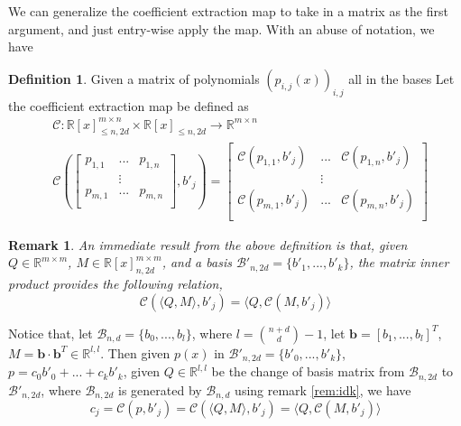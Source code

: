 \documentclass[12pt]{amsart}
\numberwithin{equation}{section}
\newtheorem{remark}[thm]{Remark}
\theoremstyle{definition}
\newtheorem{definition}[thm]{Definition}
\numberwithin{thm}{section}
\begin{document}
\smallskip 
We can generalize the {coefficient extraction map} to take in a matrix as the first argument, and just entry-wise apply the map. With an abuse of notation, we have 
\begin{definition}
     Given a matrix of polynomials $(p_{i, j}(x))_{i, j}$ all in the bases Let the {coefficient extraction map} be defined as 
     \begin{equation*}
          \begin{split}
               & \mathcal{C}: \mathbb{R}[x]_{\leq n, 2d}^{m \times n} \times \mathbb{R}[x]_{\leq n, 2d} \rightarrow \mathbb{R}^{m \times n} \\
               & \mathcal{C}(
                    \begin{bmatrix} 
                         p_{1, 1} & ... & p_{1, n} \\
                         & \vdots \\
                         p_{m, 1} & ... & p_{m, n} \\
                    \end{bmatrix}, b'_j
               ) = \begin{bmatrix} 
                    \mathcal{C}(p_{1, 1}, b'_j) & ... &  \mathcal{C}(p_{1, n}, b'_j) \\
                    & \vdots \\
                    \mathcal{C}(p_{m, 1}, b'_j) & ... &  \mathcal{C}(p_{m, n}, b'_j) \\
                    \end{bmatrix}
          \end{split}
     \end{equation*}
\end{definition}

\begin{remark}
     An immediate result from the above definition is that, given $Q \in \mathbb{R}^{m \times m}$, $M \in \mathbb{R}[x]_{n, 2d}^{m \times m}$, 
     and a basis $\mathcal{B}'_{n, 2d} = \{b'_1, ..., b'_k\}$, the matrix inner product provides the following relation,
     \begin{equation*}
          \mathcal{C}(\langle Q, M \rangle, b'_j) = \langle Q, \mathcal{C}(M, b'_j) \rangle
     \end{equation*}
\end{remark}

\smallskip
Notice that, let $\mathcal{B}_{n, d} = \{b_0,...,b_l\}$, where $l = {n + d \choose d} - 1$, 
let $\mathbf{b} = [b_1, ..., b_l]^T$, $M = \mathbf{b} \cdot \mathbf{b}^T \in \mathbb{R}^{l, l}$. 
Then given $p(x)$ in $\mathcal{B}'_{n, 2d} = \{b'_0, ..., b'_k\}$, $p = c_0b'_0 + ... + c_k b'_k$, 
given $Q \in \mathbb{R}^{l, l}$ be the change of basis matrix from $\mathcal{B}_{n, 2d}$ to $\mathcal{B}'_{n, 2d}$, 
where $\mathcal{B}_{n, 2d}$ is generated by $\mathcal{B}_{n, d}$ using remark \ref{rem:idk}, we have
\begin{equation}
     c_j = \mathcal{C}(p, b'_j) = \mathcal{C}(\langle Q, M \rangle, b'_j ) = \langle Q, \mathcal{C}(M, b'_j) \rangle
\end{equation}
\end{document}
